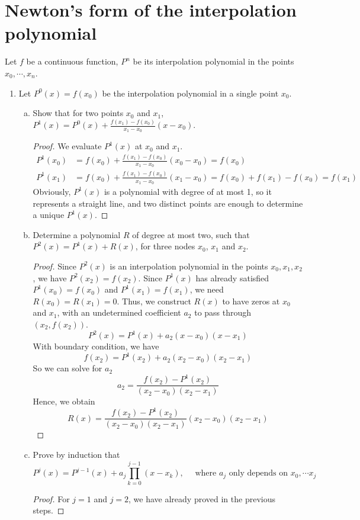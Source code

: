 \section{Newton's form of the interpolation polynomial}
Let \(f\) be a continuous function, \(P^n\) be its interpolation polynomial in the points \(x_0,\cdots,x_n\).
\begin{enumerate}
	\item Let \(P^0(x)=f(x_0)\) be the interpolation polynomial in a single point $x_0$.
	\begin{enumerate}[(a)]
		\item Show that for two points $x_0$ and $x_1$, \(P^1(x)=P^0(x)+\frac{f(x_1)-f(x_0)}{x_1-x_0}(x-x_0)\).
		\begin{proof}
		We evaluate \(P^1(x)\) at $x_0$ and $x_1$.
		\begin{align*}
		P^1(x_0)&=f(x_0)+\frac{f(x_1)-f(x_0)}{x_1-x_0}(x_0-x_0)=f(x_0)\\
		P^1(x_1)&=f(x_0)+\frac{f(x_1)-f(x_0)}{x_1-x_0}(x_1-x_0)=f(x_0)+f(x_1)-f(x_0)=f(x_1)
		\end{align*}
		Obviously, \(P^1(x)\) is a polynomial with degree of at most 1, so it represents a straight line, and two distinct points are enough to determine a unique \(P^1(x)\).
		\end{proof}
		\item Determine a polynomial $R$ of degree at most two, such that \( P^2(x)=P^1(x)+R(x) \), for three nodes $x_0$, $x_1$ and $x_2$.
		\begin{proof}
		Since \(P^2(x)\) is an interpolation polynomial in the points \(x_0,x_1,x_2\), we have \(P^2(x_2)=f(x_2)\).
		Since \(P^1(x)\) has already satisfied \(P^1(x_0)=f(x_0)\) and \(P^1(x_1)=f(x_1)\), we need \(R(x_0)=R(x_1)=0\).
		Thus, we construct \(R(x)\) to have zeros at $x_0$ and $x_1$, with an undetermined coefficient $a_2$ to pass through \((x_2,f(x_2))\).
		\[ P^2(x)=P^1(x)+a_2(x-x_0)(x-x_1) \]
		With boundary condition, we have
		\[ f(x_2)=P^1(x_2)+a_2(x_2-x_0)(x_2-x_1) \]
		So we can solve for $a_2$
		\[ a_2=\frac{f(x_2)-P^1(x_2)}{(x_2-x_0)(x_2-x_1)} \]
		Hence, we obtain
		\[ R(x)=\frac{f(x_2)-P^1(x_2)}{(x_2-x_0)(x_2-x_1)}(x_2-x_0)(x_2-x_1) \]
		\end{proof}
		\item Prove by induction that
		\[ P^j(x)=P^{j-1}(x)+a_j\prod_{k=0}^{j-1}(x-x_k), \quad \textrm{ where } a_j \textrm{ only depends on } x_0,\cdots x_j \]
		\begin{proof}
		For \(j=1\) and \(j=2\), we have already proved in the previous steps.

\end{proof}
\end{enumerate}
\end{enumerate}

